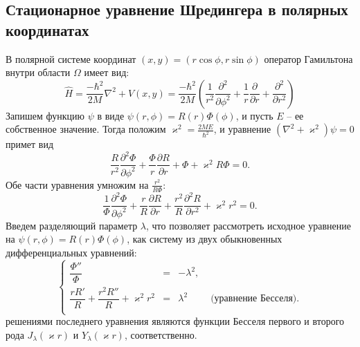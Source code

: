 \subsection{Стационарное уравнение Шредингера в полярных координатах}\label{subsec:ch1/sec1/sub1}
В полярной системе координат $(x, y) = (r\cos \phi, r\sin \phi)$ оператор Гамильтона внутри области $\Omega$ имеет вид:
\begin{equation*}
\hat{H} = \frac{-\hbar^2}{2M} \nabla^2  + V(x, y) = 
\frac{-\hbar^2}{2M} \left(\frac{1}{r^2}\frac{\partial^2}{\partial \phi^2} + \frac{1}{r}\frac{\partial}{\partial r} + \frac{\partial^2}{\partial r^2}\right) 
\end{equation*}
Запишем функцию $\psi$ в виде $\psi(r, \phi) = R(r)\Phi(\phi)$, и пусть $E$ -- ее собственное значение. Тогда положим $\varkappa^2 = \frac{2M E}{\hbar^2}$, и уравнение $(\nabla^2  + \varkappa^2) \psi=0$ примет вид 
$$ \frac{R}{r^2}\frac{\partial^2\Phi}{\partial\phi^2} + \frac{\Phi}{r}\frac{\partial R}{\partial r} + \Phi  +\varkappa^2R\Phi = 0.$$
Обе части уравнения умножим на $\frac{r^2}{R\Phi}$:
$$ \frac{1}{\Phi}\frac{\partial^2\Phi}{\partial\phi^2} + \frac{r}{R}\frac{\partial R}{\partial r} + \frac{r^2}{R}\frac{\partial^2 R}{\partial r^2} + \varkappa^2r^2 = 0.$$
Введем разделяющий параметр $\lambda$, что позволяет рассмотреть исходное уравнение на $\psi(r, \phi) = R(r)\Phi(\phi)$, как систему из двух обыкновенных дифференциальных уравнений:
\begin{equation*}
\left\{\begin{array}{rcll}
    \dfrac{\Phi''}{\Phi} &=&-\lambda^2, \\
    \dfrac{rR'}{R} + \dfrac{r^2R''}{R} + \varkappa^2r^2 &=& \lambda^2  \quad 	 &\textit{   (уравнение Бесселя)}. \\
\end{array}
\right.
\end{equation*}
решениями последнего уравнения являются функции Бесселя первого и второго рода $J_\lambda(\varkappa r)$ и $Y_\lambda(\varkappa r)$, соответственно. 


